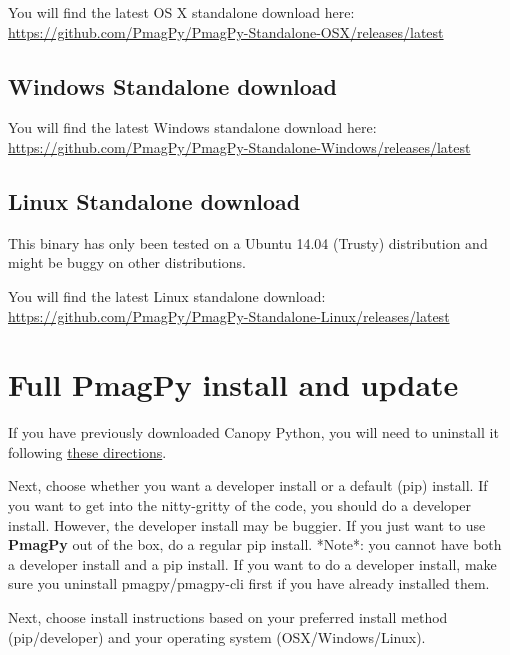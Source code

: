 \documentclass[11pt]{book}
\begin{document}
{\noindent You will find the latest OS X standalone download here: \href{https://github.com/PmagPy/PmagPy-Standalone-OSX/releases/latest}{https://github.com/PmagPy/PmagPy-Standalone-OSX/releases/latest}

\subsection{Windows Standalone download}

\noindent You will find the latest Windows standalone download here: \href{https://github.com/PmagPy/PmagPy-Standalone-Windows/releases/latest}{https://github.com/PmagPy/PmagPy-Standalone-Windows/releases/latest}

\subsection{Linux Standalone download}

This binary has only been tested on a Ubuntu 14.04 (Trusty) distribution and might be buggy on other distributions.

\noindent You will find the latest Linux standalone download: \href{https://github.com/PmagPy/PmagPy-Standalone-Linux/releases/latest}{https://github.com/PmagPy/PmagPy-Standalone-Linux/releases/latest}





\section{Full PmagPy install and update}


If you have previously downloaded Canopy Python, you will need to uninstall it following \href{https://support.enthought.com/hc/en-us/articles/204469700-Uninstalling-and-resetting-Canopy}{these directions}.

Next, choose whether you want a developer install or a default (pip) install.  If you want to get into the nitty-gritty of the code, you should do a developer install.  However, the developer install may be buggier.  If you just want to use {\bf PmagPy} out of the box, do a regular pip install.  *Note*: you cannot have both a developer install and a pip install.  If you want to do a developer install, make sure you uninstall pmagpy/pmagpy-cli first if you have already installed them.

Next, choose install instructions based on your preferred install method (pip/developer) and your operating system (OSX/Windows/Linux).

}
\end{document}
